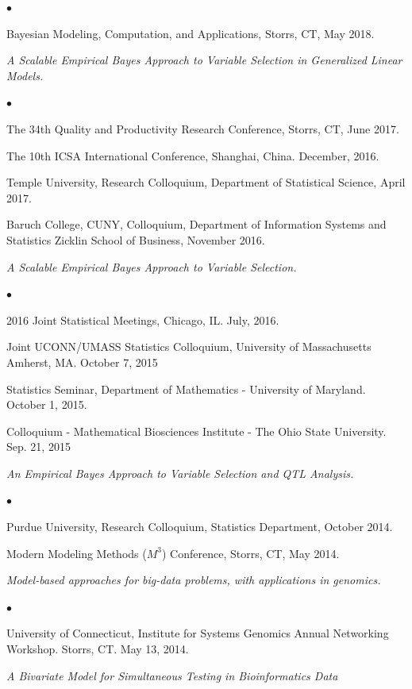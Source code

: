 \documentclass[12pt,a4paper]{article}
\newenvironment{list1}{
  \begin{list}{\ding{113}}{%
      \setlength{\itemsep}{0in}
      \setlength{\parsep}{0in} \setlength{\parskip}{0in}
      \setlength{\topsep}{0in} \setlength{\partopsep}{0in}
      \setlength{\leftmargin}{0.17in}}}{\end{list}}
\newenvironment{list2}{
  \begin{list}{$\bullet$}{%
      \setlength{\itemsep}{0in}
      \setlength{\parsep}{0in} \setlength{\parskip}{0in}
      \setlength{\topsep}{0in} \setlength{\partopsep}{0in}
      \setlength{\leftmargin}{0.2in}}}{\end{list}}
\begin{document}
\begin{list1}
\begin{list2}
\item[-] Bayesian Modeling, Computation, and Applications, Storrs, CT, May 2018.
\end{list2}
\textit{A Scalable Empirical Bayes Approach to Variable
Selection in Generalized Linear Models.}
\begin{list2}
\item[-] The 34th Quality and Productivity Research Conference, Storrs, CT, June 2017.
\item[-] The 10th ICSA International Conference, Shanghai, China. December, 2016.
\item[-] Temple University, Research Colloquium, Department of Statistical Science, April 2017.
\item[-] Baruch College, CUNY, Colloquium, Department of Information Systems and Statistics Zicklin School of Business, November 2016.
\end{list2}
\item[]\textit{A Scalable Empirical Bayes Approach to Variable Selection.}
\begin{list2}
\item[-] 2016 Joint Statistical Meetings, Chicago, IL. July, 2016.
\item[-] Joint UCONN/UMASS Statistics Colloquium, University of Massachusetts Amherst, MA. October 7, 2015
\item[-] Statistics Seminar, Department of Mathematics - University of Maryland. October 1, 2015.
\item[-] Colloquium - Mathematical Biosciences Institute - The Ohio State University.
Sep. 21, 2015
\end{list2}
\item[]\textit{An Empirical Bayes Approach to Variable Selection and QTL Analysis.}
\begin{list2}
\item[-] Purdue University, Research Colloquium, Statistics Department, October 2014.
\item[-] Modern Modeling Methods ($M^3$) Conference, Storrs, CT, May 2014.
\end{list2}
\item[]\textit{Model-based approaches for big-data problems, with applications in genomics.}
\begin{list2}
\item[-] University of Connecticut, Institute for Systems Genomics Annual Networking Workshop. Storrs, CT. May 13, 2014.
\end{list2}
\textit{A Bivariate Model for Simultaneous Testing in Bioinformatics Data}

\end{list1}
\end{document}
